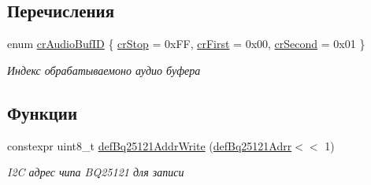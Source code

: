\subsection*{Перечисления}
\begin{DoxyCompactItemize}
\item 
enum \hyperlink{group___xD0_x9F_xD0_xB5_xD1_x80_xD0_xB5_xD1_x87_xD0_xB8_xD1_x81_xD0_xBB_xD0_xB5_xD0_xBD_xD0_xB8_xD1_x8F_ga30dd689bff585403e080598b50585936}{cr\+Audio\+Buf\+ID} \{ \hyperlink{group___xD0_x9F_xD0_xB5_xD1_x80_xD0_xB5_xD1_x87_xD0_xB8_xD1_x81_xD0_xBB_xD0_xB5_xD0_xBD_xD0_xB8_xD1_x8F_gga30dd689bff585403e080598b50585936af6f3ce609b4a10d8b2a2585f79f99fe5}{cr\+Stop} = 0x\+FF, 
\hyperlink{group___xD0_x9F_xD0_xB5_xD1_x80_xD0_xB5_xD1_x87_xD0_xB8_xD1_x81_xD0_xBB_xD0_xB5_xD0_xBD_xD0_xB8_xD1_x8F_gga30dd689bff585403e080598b50585936a02daa0965719dc30dc206f51ec6bc4a0}{cr\+First} = 0x00, 
\hyperlink{group___xD0_x9F_xD0_xB5_xD1_x80_xD0_xB5_xD1_x87_xD0_xB8_xD1_x81_xD0_xBB_xD0_xB5_xD0_xBD_xD0_xB8_xD1_x8F_gga30dd689bff585403e080598b50585936a7a4ceb19867c6e9a69edef27504f9f2a}{cr\+Second} = 0x01
 \}\begin{DoxyCompactList}\small\item\em Индекс обрабатываемоно аудио буфера \end{DoxyCompactList}
\end{DoxyCompactItemize}
\subsection*{Функции}
\begin{DoxyCompactItemize}
\item 
\mbox{\label{namespaceunit_a00a34096b0492123f3830e75447e59d7}} 
constexpr uint8\+\_\+t \hyperlink{namespaceunit_a00a34096b0492123f3830e75447e59d7}{def\+Bq25121\+Addr\+Write} (\hyperlink{namespaceunit_af46d6c2767dafd308cf474c40fbeb8ec}{def\+Bq25121\+Adrr}$<$$<$ 1)
\begin{DoxyCompactList}\small\item\em I2C адрес чипа B\+Q25121 для записи \end{DoxyCompactList}\end{DoxyCompactItemize}
